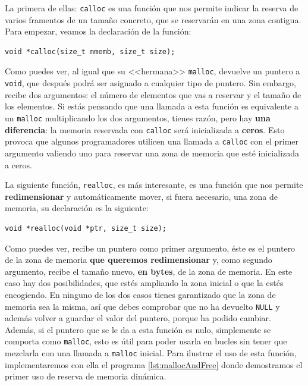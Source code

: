 \documentclass[a4paper]{article}
\begin{document}
La primera de ellas: \verb!calloc! es una función que nos permite indicar la
reserva de varios framentos de un tamaño concreto, que se reservarán en una
zona contigua. Para empezar, veamos la declaración de la función:

\noindent
\begin{minipage}[H]{\linewidth}
\mbox{}
\begin{lstlisting}[style=C,
caption={Declaración de la función \texttt{calloc}},
label={lst:callocSignature}]
void *calloc(size_t nmemb, size_t size);
\end{lstlisting}
\end{minipage}
Como puedes ver, al igual que su <<hermana>> \verb!malloc!, devuelve un
puntero a \verb!void!, que después podrá ser asignado a cualquier tipo de
puntero. Sin embargo, recibe dos argumentos: el número de elementos que vas
a reservar y el tamaño de los elementos. Si estás pensando que una llamada a
esta función es equivalente a un \verb!malloc! multiplicando los dos argumentos,
tienes razón, pero hay \textbf{una diferencia}: la memoria reservada con
\verb!calloc! será inicializada a \textbf{ceros}. Esto provoca que algunos
programadores utilicen una llamada a \verb!calloc! con el primer argumento
valiendo uno para reservar una zona de memoria que esté inicializada a ceros.

La siguiente función, \verb!realloc!, es más interesante, es una función que nos
permite \textbf{redimensionar} y automáticamente mover, si fuera necesario,
una zona de memoria, su declaración es la siguiente:

\noindent
\begin{minipage}[H]{\linewidth}
\mbox{}
\begin{lstlisting}[style=C,
caption={Declaración de la función \texttt{realloc}},
label={lst:callocSignature}]
void *realloc(void *ptr, size_t size);
\end{lstlisting}
\end{minipage}
Como puedes ver, recibe un puntero como primer argumento, éste es el puntero
de la zona de memoria \textbf{que queremos redimensionar} y, como segundo argumento,
recibe el tamaño nuevo, \textbf{en bytes}, de la zona de memoria. En este caso hay
dos posibilidades, que estés ampliando la zona inicial o que la estés
encogiendo. En ninguno de los dos casos tienes garantizado que la zona de
memoria sea la misma, así que debes comprobar que no ha devuelto \verb!NULL! y
además volver a guardar el valor del puntero, porque ha podido cambiar.
Además, si el puntero que se le da a esta función es nulo, simplemente se
comporta como \verb!malloc!, esto es útil para poder usarla en bucles sin tener
que mezclarla con una llamada a \verb!malloc! inicial.
Para ilustrar el uso de esta función, implementaremos con ella el programa
\ref{lst:mallocAndFree} donde demostramos el primer uso de reserva de memoria
dinámica.
\end{document}
